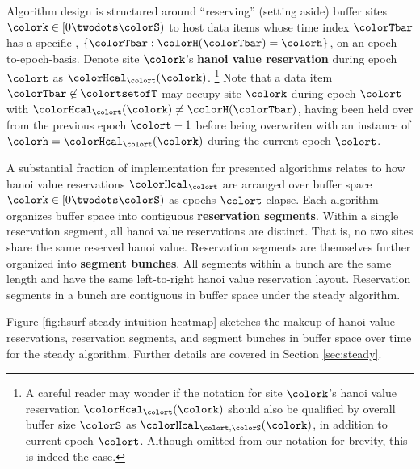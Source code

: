 Algorithm design is structured around ``reserving'' (setting aside) buffer sites $\colork \in [0 \twodots \colorS)$ to host data items whose time index $\colorTbar$ has a specific \hv{}, $\{\colorTbar : \colorH(\colorTbar) = \colorh \}$, on an epoch-to-epoch-basis.
Denote site $\colork$'s \textbf{hanoi value reservation} during epoch $\colort$ as $\colorHcal_{\colort}(\colork)$.%
\footnote{
A careful reader may wonder if the notation for site $\colork$'s hanoi value reservation $\colorHcal_{\colort}(\colork)$ should also be qualified by overall buffer size $\colorS$ as $\colorHcal_{\colort,\colorS}(\colork)$, in addition to current epoch $\colort$.
Although omitted from our notation for brevity, this is indeed the case.
}
Note that a data item $\colorTbar \not\in \colortsetofT$ may occupy site $\colork$ during epoch $\colort$ with $\colorHcal_{\colort}(\colork) \neq \colorH(\colorTbar)$, having been held over from the previous epoch $\colort - 1$ before being overwriten with an instance of \hv{} $\colorh = \colorHcal_{\colort}(\colork)$ during the current epoch $\colort$.

A substantial fraction of implementation for presented algorithms relates to how hanoi value reservations $\colorHcal_{\colort}$ are arranged over buffer space $\colork \in [0\twodots\colorS)$ as epochs $\colort$ elapse.
Each algorithm organizes buffer space into contiguous \textbf{reservation segments}.
Within a single reservation segment, all hanoi value reservations are distinct.
That is, no two sites share the same reserved hanoi value.
Reservation segments are themselves further organized into \textbf{segment bunches}.
All segments within a bunch are the same length and have the same left-to-right hanoi value reservation layout.
Reservation segments in a bunch are contiguous in buffer space under the steady algorithm. %

Figure \ref{fig:hsurf-steady-intuition-heatmap} sketches the makeup of hanoi value reservations, reservation segments, and segment bunches in buffer space over time for the steady algorithm.
Further details are covered in Section \cref{sec:steady}.


